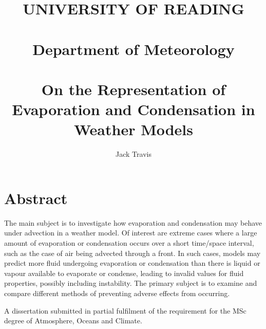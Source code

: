 \documentclass[11pt]{article}
\begin{document}
\thispagestyle{empty}
\title{UNIVERSITY OF READING\\
~\\
Department of Meteorology\\
~\\
On the Representation of Evaporation and Condensation in Weather Models}
\author{Jack Travis}
\maketitle

\section{Abstract}
The main subject is to investigate how evaporation and condensation may behave under advection in a weather model. Of interest are extreme cases where a large amount of evaporation or condensation occurs over a short time/space interval, such as the case of air being advected through a front. In such cases, models may predict more fluid undergoing evaporation or condensation than there is liquid or vapour available to evaporate or condense, leading to invalid values for fluid properties, possibly including instability. The primary subject is to examine and compare different methods of preventing adverse effects from occurring.

\null \vfill
A dissertation submitted in partial fulfilment of the requirement for the MSc degree of Atmosphere, Oceans and Climate.

\newpage
\tableofcontents

\newpage
\end{document}
